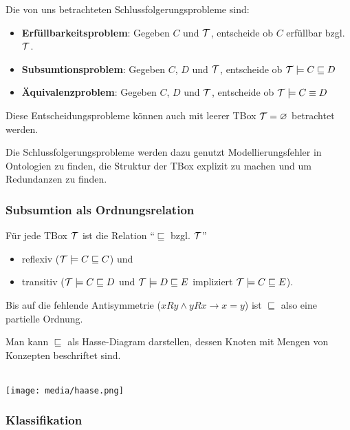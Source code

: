 Die von uns betrachteten Schlussfolgerungsprobleme sind:

\begin{itemize}
  \item \textbf{Erfüllbarkeitsproblem}: Gegeben $C$ und $\mathcal{T}$, entscheide ob $C$ erfüllbar bzgl. $\mathcal{T}$.
  \item \textbf{Subsumtionsproblem}: Gegeben $C$, $D$ und $\mathcal{T}$, entscheide ob $\mathcal{T} \models C \sqsubseteq D$
  \item \textbf{Äquivalenzproblem}: Gegeben $C$, $D$ und $\mathcal{T}$, entscheide ob $\mathcal{T} \models C \equiv D$
\end{itemize}

Diese Entscheidungsprobleme können auch mit leerer TBox $\mathcal{T} = \varnothing$ betrachtet werden.

Die Schlussfolgerungsprobleme werden dazu genutzt Modellierungsfehler in Ontologien zu finden, die Struktur der TBox explizit zu machen und um Redundanzen zu finden.

\subsubsection{Subsumtion als Ordnungsrelation}\label{subordn}

\begin{lemma}
    Für jede TBox $\mathcal{T}$ ist die Relation \enquote{$\sqsubseteq$ bzgl. $\mathcal{T}$}

\begin{itemize}
  \item reflexiv ($\mathcal{T} \models C \sqsubseteq C$) und
  \item transitiv ($\mathcal{T} \models C \sqsubseteq D$ und $\mathcal{T} \models D \sqsubseteq E$ impliziert $\mathcal{T} \models C \sqsubseteq E$).
\end{itemize}
Bis auf die fehlende Antisymmetrie ($xRy \wedge yRx \rightarrow x = y$) ist $\sqsubseteq$ also eine partielle Ordnung.
\end{lemma}

Man kann $\sqsubseteq$ als Hasse-Diagram darstellen, dessen Knoten mit Mengen von Konzepten beschriftet sind.

\begin{tafel}\mbox{}\\
\texttt{[image: media/haase.png]}
\end{tafel}

\subsubsection{Klassifikation}

